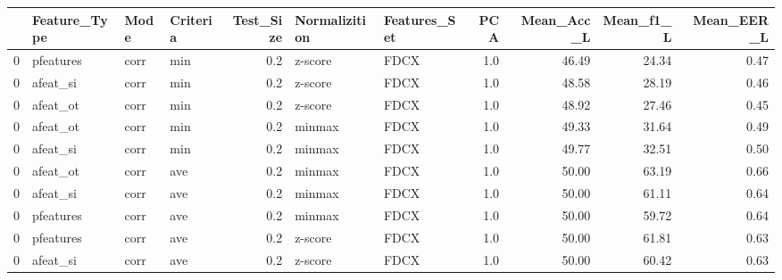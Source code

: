 \begin{tabular}{llllrllrrrr}
\toprule
{} & Feature\_Type &  Mode & Criteria &  Test\_Size & Normalizition & Features\_Set &  PCA &  Mean\_Acc\_L &  Mean\_f1\_L &  Mean\_EER\_L \\
\midrule
0 &    pfeatures &  corr &      min &        0.2 &       z-score &         FDCX &  1.0 &       46.49 &      24.34 &        0.47 \\
0 &     afeat\_si &  corr &      min &        0.2 &       z-score &         FDCX &  1.0 &       48.58 &      28.19 &        0.46 \\
0 &     afeat\_ot &  corr &      min &        0.2 &       z-score &         FDCX &  1.0 &       48.92 &      27.46 &        0.45 \\
0 &     afeat\_ot &  corr &      min &        0.2 &        minmax &         FDCX &  1.0 &       49.33 &      31.64 &        0.49 \\
0 &     afeat\_si &  corr &      min &        0.2 &        minmax &         FDCX &  1.0 &       49.77 &      32.51 &        0.50 \\
0 &     afeat\_ot &  corr &      ave &        0.2 &        minmax &         FDCX &  1.0 &       50.00 &      63.19 &        0.66 \\
0 &     afeat\_si &  corr &      ave &        0.2 &        minmax &         FDCX &  1.0 &       50.00 &      61.11 &        0.64 \\
0 &    pfeatures &  corr &      ave &        0.2 &        minmax &         FDCX &  1.0 &       50.00 &      59.72 &        0.64 \\
0 &    pfeatures &  corr &      ave &        0.2 &       z-score &         FDCX &  1.0 &       50.00 &      61.81 &        0.63 \\
0 &     afeat\_si &  corr &      ave &        0.2 &       z-score &         FDCX &  1.0 &       50.00 &      60.42 &        0.63 \\
\bottomrule
\end{tabular}
